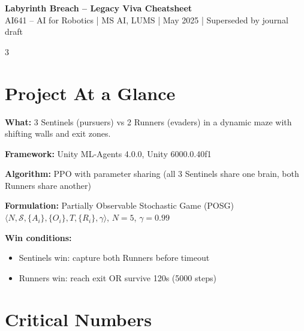 \documentclass[10pt,landscape,a4paper]{article}
\begin{document}
\begin{center}
{\Large\bfseries Labyrinth Breach -- Legacy Viva Cheatsheet} \\[2pt]
{\small AI641 -- AI for Robotics | MS AI, LUMS | May 2025 | Superseded by journal draft}
\end{center}
\vspace{-4pt}

\begin{multicols}{3}

\section{Project At a Glance}

\textbf{What:} 3 Sentinels (pursuers) vs 2 Runners (evaders) in a dynamic maze with shifting walls and exit zones.

\textbf{Framework:} Unity ML-Agents 4.0.0, Unity 6000.0.40f1

\textbf{Algorithm:} PPO with parameter sharing (all 3 Sentinels share one brain, both Runners share another)

\textbf{Formulation:} Partially Observable Stochastic Game (POSG) \\
$\langle N, \mathcal{S}, \{A_i\}, \{O_i\}, T, \{R_i\}, \gamma \rangle$, $N{=}5$, $\gamma{=}0.99$

\textbf{Win conditions:}
\begin{itemize}
\item Sentinels win: capture both Runners before timeout
\item Runners win: reach exit OR survive 120s (5000 steps)
\end{itemize}

\section{Critical Numbers}


\end{multicols}
\end{document}
